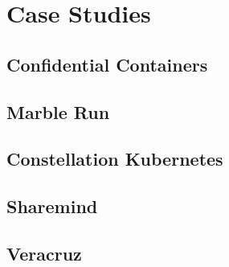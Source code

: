 
\chapter{Case Studies}

\section{Confidential Containers}

\section{Marble Run}

\section{Constellation Kubernetes}

\section{Sharemind}

\section{Veracruz}
